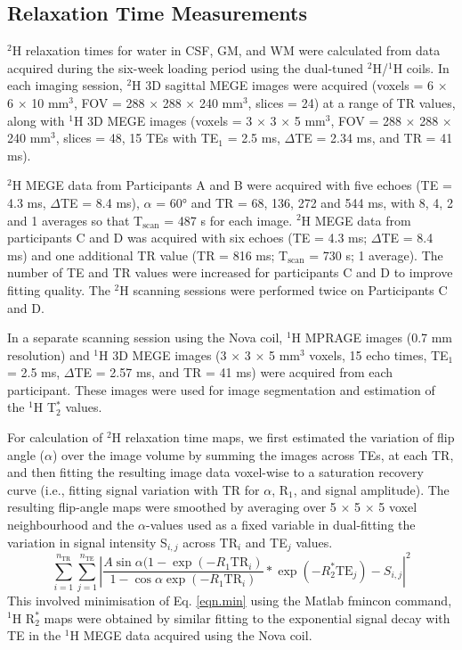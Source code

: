 \subsection{Relaxation Time Measurements}
\label{Chap:D2O:Relaxation}

$^2$H relaxation times for water in \ac{CSF}, \ac{GM}, and \ac{WM} were calculated from data acquired during the six-week loading period using the dual-tuned $^2$H/$^1$H coils. In each imaging session, $^2$H 3D sagittal \ac{MEGE} images were acquired (voxels = 6 $\times$ 6 $\times$ 10 mm$^3$, \ac{FOV} = 288 $\times$ 288 $\times$ 240 mm$^3$, slices = 24) at a range of \ac{TR} values, along with $^1$H 3D \ac{MEGE} images (voxels = 3 $\times$ 3 $\times$ 5 mm$^3$, \ac{FOV} = 288 $\times$ 288 $\times$ 240 mm$^3$, slices = 48, 15 \ac{TE}s with TE$_1$ = 2.5 ms, $\Delta$TE = 2.34 ms, and TR = 41 ms). 

$^2$H \ac{MEGE} data from Participants A and B were acquired with five echoes (\ac{TE} = 4.3 ms, $\Delta$TE = 8.4 ms), $\alpha$ = 60° and \ac{TR} = 68, 136, 272 and 544 ms, with 8, 4, 2 and 1 averages so that T$_\text{scan}$ = 487 s for each image. $^2$H \ac{MEGE} data from participants C and D was acquired with six echoes (\ac{TE} = 4.3 ms; $\Delta$TE = 8.4 ms) and one additional \ac{TR} value (TR = 816 ms; T$_\text{scan}$ = 730 s; 1 average). 
The number of \ac{TE} and \ac{TR} values were increased for participants C and D to improve fitting quality. The $^2$H scanning sessions were performed twice on Participants C and D.

In a separate scanning session using the Nova coil, $^1$H  \ac{MPRAGE} images (0.7 mm resolution) and $^1$H 3D \ac{MEGE} images (3 $\times$ 3 $\times$ 5 mm$^3$ voxels, 15 echo times, TE$_1$ = 2.5 ms, $\Delta$TE = 2.57 ms, and \ac{TR} = 41 ms) were acquired from each participant. These images were used for image segmentation and estimation of the $^1$H T$_2^*$ values. 

For calculation of $^2$H relaxation time maps, we first estimated the variation of flip angle ($\alpha$) over the image volume by summing the images across \ac{TE}s, at each \ac{TR}, and then fitting the resulting image data voxel-wise to a saturation recovery curve (i.e., fitting signal variation with \ac{TR} for $\alpha$, R$_1$, and signal amplitude). The resulting flip-angle maps were smoothed by averaging over 5 $\times$ 5 $\times$ 5 voxel neighbourhood and the $\alpha$-values used as a fixed variable in dual-fitting the variation in signal intensity S$_{i,j}$ across TR$_i$ and TE$_j$  values. 
\begin{equation}
     \sum_{i=1}^{n_{\text{TR}}}\sum_{j=1}^{n_{\text{TE}}}\left|\frac{A\sin{\alpha}(1-\exp(-R_1 \text{TR}_i)}{1-\cos{\alpha}\exp(-R_1 \text{TR}_i)}*\exp(-R_2^*\text{TE}_j) - S_{i,j}\right|^2
     \label{eqn.min}
\end{equation}
This involved minimisation of Eq. \ref{eqn.min} using the Matlab fmincon command, $^1$H R$_2^*$ maps were obtained by similar fitting to the exponential signal decay with \ac{TE} in the $^1$H \ac{MEGE} data acquired using the Nova coil.

